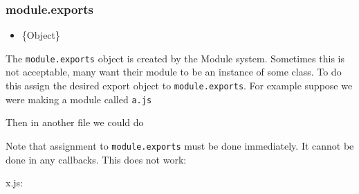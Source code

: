 \subsubsection{module.exports}

\begin{itemize}
\item
  \{Object\}
\end{itemize}

The \texttt{module.exports} object is created by the Module system.
Sometimes this is not acceptable, many want their module to be an
instance of some class. To do this assign the desired export object to
\texttt{module.exports}. For example suppose we were making a module
called \texttt{a.js}

\begin{Shaded}
\begin{Highlighting}[]
 \NormalTok{;}

 \NormalTok{= } 

\NormalTok{() \{}
  \NormalTok{(}\NormalTok{);}
\NormalTok{\}, }\NormalTok{);}
\end{Highlighting}
\end{Shaded}

Then in another file we could do

\begin{Shaded}
\begin{Highlighting}[]
 \NormalTok{);}
\NormalTok{(}\NormalTok{, }\NormalTok{() \{}
  \NormalTok{(}\NormalTok{);}
\NormalTok{\});}
\end{Highlighting}
\end{Shaded}

Note that assignment to \texttt{module.exports} must be done
immediately. It cannot be done in any callbacks. This does not work:

x.js:

\begin{Shaded}
\begin{Highlighting}[]
\NormalTok{() \{}
   \NormalTok{= \{ }\NormalTok{: } \NormalTok{\};}
\NormalTok{\}, }\NormalTok{);}
\end{Highlighting}
\end{Shaded}

